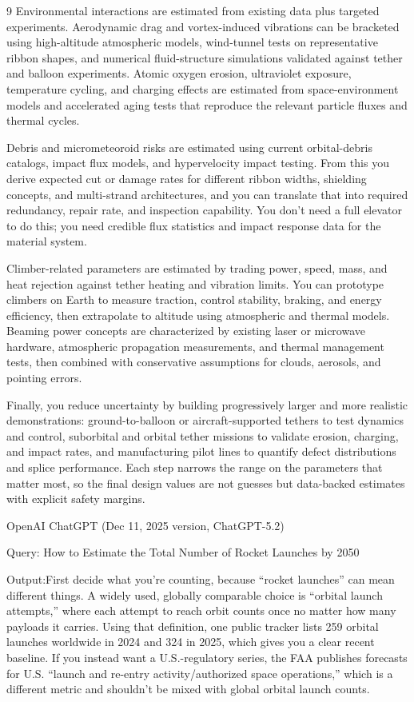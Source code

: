 \documentclass{mcmthesis}
\begin{document}
\begin{ReportAiUse}{9}
Environmental interactions are estimated from existing data plus targeted experiments. Aerodynamic drag and vortex-induced vibrations can be bracketed using high-altitude atmospheric models, wind-tunnel tests on representative ribbon shapes, and numerical fluid-structure simulations validated against tether and balloon experiments. Atomic oxygen erosion, ultraviolet exposure, temperature cycling, and charging effects are estimated from space-environment models and accelerated aging tests that reproduce the relevant particle fluxes and thermal cycles.

Debris and micrometeoroid risks are estimated using current orbital-debris catalogs, impact flux models, and hypervelocity impact testing. From this you derive expected cut or damage rates for different ribbon widths, shielding concepts, and multi-strand architectures, and you can translate that into required redundancy, repair rate, and inspection capability. You don’t need a full elevator to do this; you need credible flux statistics and impact response data for the material system.

Climber-related parameters are estimated by trading power, speed, mass, and heat rejection against tether heating and vibration limits. You can prototype climbers on Earth to measure traction, control stability, braking, and energy efficiency, then extrapolate to altitude using atmospheric and thermal models. Beaming power concepts are characterized by existing laser or microwave hardware, atmospheric propagation measurements, and thermal management tests, then combined with conservative assumptions for clouds, aerosols, and pointing errors.

Finally, you reduce uncertainty by building progressively larger and more realistic demonstrations: ground-to-balloon or aircraft-supported tethers to test dynamics and control, suborbital and orbital tether missions to validate erosion, charging, and impact rates, and manufacturing pilot lines to quantify defect distributions and splice performance. Each step narrows the range on the parameters that matter most, so the final design values are not guesses but data-backed estimates with explicit safety margins.



OpenAI ChatGPT (Dec 11, 2025 version, ChatGPT-5.2) 

Query: How to Estimate the Total Number of Rocket Launches by 2050

Output:First decide what you’re counting, because “rocket launches” can mean different things. A widely used, globally comparable choice is “orbital launch attempts,” where each attempt to reach orbit counts once no matter how many payloads it carries. Using that definition, one public tracker lists 259 orbital launches worldwide in 2024 and 324 in 2025, which gives you a clear recent baseline. If you instead want a U.S.-regulatory series, the FAA publishes forecasts for U.S. “launch and re-entry activity/authorized space operations,” which is a different metric and shouldn’t be mixed with global orbital launch counts.


\end{ReportAiUse}
\end{document}
